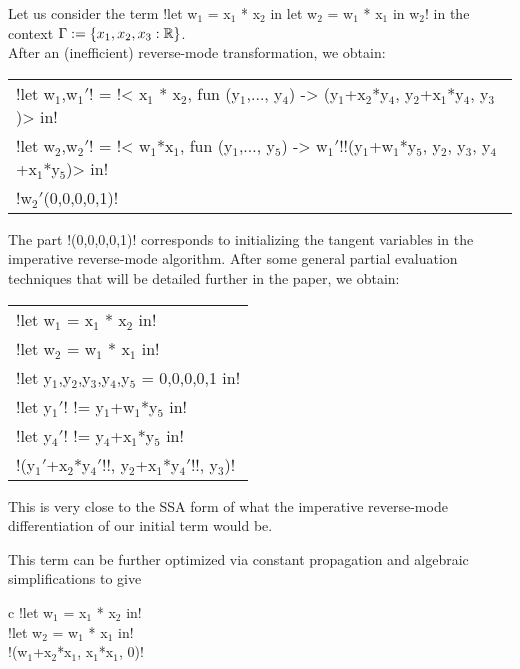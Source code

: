 \begin{example}[First-order term]
Let us consider the term !let w$_1$ = x$_1$ * x$_2$ in let w$_2$ = w$_1$ * x$_1$ in w$_2$! in the context $\Gamma:=\{x_1,x_2, x_3:\mathbb{R}\}$.\\
After an (inefficient) reverse-mode transformation, we obtain:
\begin{center}
    \begin{tabular}{l}
        !let w$_1$,w$_1'$! = !< x$_1$ * x$_2$, fun (y$_1$,$\ldots$, y$_4$) -> (y$_1$+x$_2$*y$_4$, y$_2$+x$_1$*y$_4$, y$_3$)> in!\\
        !let w$_2$,w$_2'$! = !< w$_1$*x$_1$, fun (y$_1$,$\ldots$, y$_5$) -> w$_1'$!!(y$_1$+w$_1$*y$_5$, y$_2$, y$_3$, y$_4$+x$_1$*y$_5$)> in!\\
        !w$_2'$(0,0,0,0,1)!
    \end{tabular}
\end{center}
The part !(0,0,0,0,1)! corresponds to initializing the tangent variables in the imperative reverse-mode algorithm. 
After some general partial evaluation techniques that will be detailed further in the paper, we obtain:    

    \begin{center}
            \begin{tabular}{l}
                !let w$_1$ = x$_1$ * x$_2$ in!\\ 
                !let w$_2$ = w$_1$ * x$_1$ in!\\
                !let y$_1$,y$_2$,y$_3$,y$_4$,y$_5$ = 0,0,0,0,1 in!\\
                !let y$_1'$! != y$_1$+w$_1$*y$_5$ in!\\
                !let y$_4'$! != y$_4$+x$_1$*y$_5$ in!\\
                !(y$_1'$+x$_2$*y$_4'$!!, y$_2$+x$_1$*y$_4'$!!, y$_3$)!
            \end{tabular}
    \end{center}   
This is very close to the SSA form \cite{cytron1989efficient} of what the imperative reverse-mode differentiation of our initial term would be.

\begin{absolutelynopagebreak}
This term can be further optimized via constant propagation and algebraic simplifications to give
    \begin{center}
            \begin{tabular}{{c}}
                !let w$_1$ = x$_1$ * x$_2$ in!\\ 
                !let w$_2$ = w$_1$ * x$_1$ in!\\
                !(w$_1$+x$_2$*x$_1$, x$_1$*x$_1$, 0)!
            \end{tabular}
    \end{center}
\end{absolutelynopagebreak}

\end{example}


